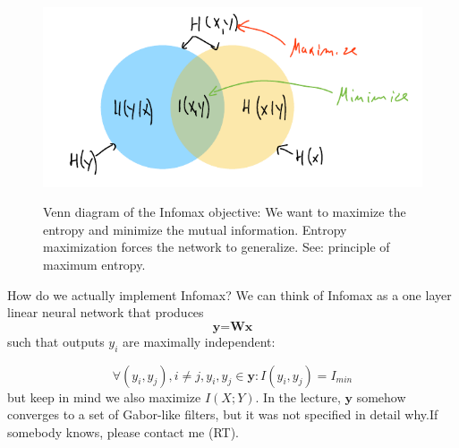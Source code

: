 \documentclass[main]{subfiles}
\begin{document}
\begin{figure}[H]
	\centering
	\includegraphics[width=0.8\linewidth]{07_UnsupervisedAndSelfsupervisedLearning/figures/mutual-info.png}
	\label{fig:mutual-info}
	\caption{Venn diagram of the Infomax objective: We want to maximize the entropy and minimize the mutual information. Entropy maximization forces the network to generalize. See: principle of maximum entropy.}
\end{figure}

How do we actually implement Infomax? We can think of Infomax as a one layer linear neural network that produces
\begin{equation}
\textbf{y} = \textbf{W}\textbf{x}
\end{equation}
such that outputs $y_i$ are maximally independent:

\begin{equation}
\forall (y_i, y_j), i\neq j,  y_i,y_j \in \textbf{y}: I(y_i, y_j) = I_{min}
\end{equation}
but keep in mind we also maximize $I(X;Y)$. In the lecture, $\textbf{y}$ somehow converges to a set of Gabor-like filters, but it was not specified in detail why.If somebody knows, please contact me (RT).
\end{document}
